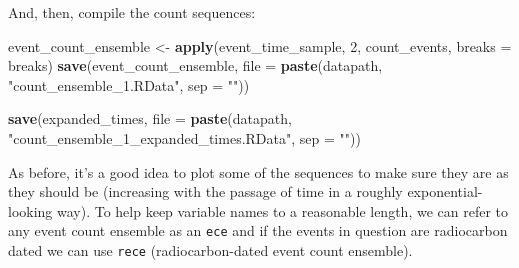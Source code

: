 \documentclass[]{article}
\newenvironment{Shaded}{\begin{snugshade}}{\end{snugshade}}
\newcommand{\KeywordTok}[1]{\textcolor[rgb]{0.13,0.29,0.53}{\textbf{#1}}}
\newcommand{\DataTypeTok}[1]{\textcolor[rgb]{0.13,0.29,0.53}{#1}}
\newcommand{\DecValTok}[1]{\textcolor[rgb]{0.00,0.00,0.81}{#1}}
\newcommand{\StringTok}[1]{\textcolor[rgb]{0.31,0.60,0.02}{#1}}
\newcommand{\NormalTok}[1]{#1}
\begin{document}
And, then, compile the count sequences:

\begin{Shaded}
\begin{Highlighting}[]
\NormalTok{event_count_ensemble <-}\StringTok{ }\KeywordTok{apply}\NormalTok{(event_time_sample,}
                            \DecValTok{2}\NormalTok{,}
\NormalTok{                            count_events,}
                            \DataTypeTok{breaks =}\NormalTok{ breaks)}
\KeywordTok{save}\NormalTok{(event_count_ensemble,}
    \DataTypeTok{file =} \KeywordTok{paste}\NormalTok{(datapath,}
                \StringTok{"count_ensemble_1.RData"}\NormalTok{,}
                \DataTypeTok{sep =} \StringTok{""}\NormalTok{))}

\KeywordTok{save}\NormalTok{(expanded_times,}
    \DataTypeTok{file =} \KeywordTok{paste}\NormalTok{(datapath,}
                \StringTok{"count_ensemble_1_expanded_times.RData"}\NormalTok{,}
                \DataTypeTok{sep =} \StringTok{""}\NormalTok{))}
\end{Highlighting}
\end{Shaded}

As before, it's a good idea to plot some of the sequences to make sure
they are as they should be (increasing with the passage of time in a
roughly exponential-looking way). To help keep variable names to a
reasonable length, we can refer to any event count ensemble as an
\texttt{ece} and if the events in question are radiocarbon dated we can
use \texttt{rece} (radiocarbon-dated event count ensemble).
\end{document}
